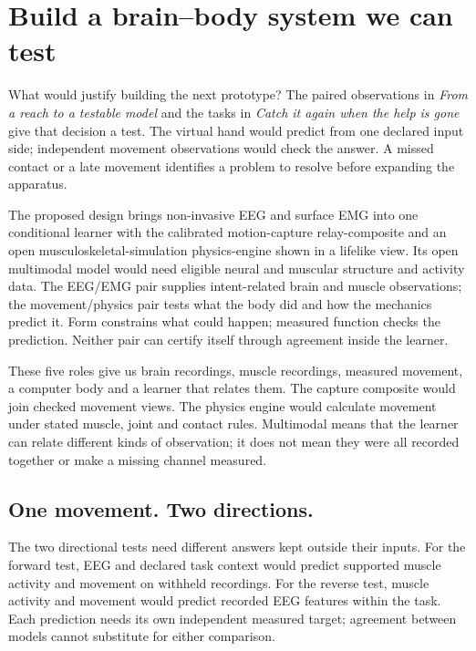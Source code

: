 \section{Build a brain--body system we can test}

What would justify building the next prototype? The paired observations in
\emph{From a reach to a testable model} and the tasks in \emph{Catch it again
when the help is gone} give that decision a test. The virtual hand would predict
from one declared input side; independent movement observations would check the
answer. A missed contact or a late movement identifies a problem to resolve
before expanding the apparatus.

The proposed design brings non-invasive EEG and surface EMG into one conditional
learner with the calibrated motion-capture relay-composite and an open
musculoskeletal-simulation physics-engine shown in a lifelike view. Its open
multimodal model would need eligible neural and muscular structure and activity
data. The EEG/EMG pair supplies intent-related brain and muscle observations;
the movement/physics pair tests what the body did and how the mechanics predict
it. Form constrains what could happen; measured function checks the prediction.
Neither pair can certify itself through agreement inside the learner.

These five roles give us brain recordings, muscle recordings, measured
movement, a computer body and a learner that relates them. The capture
composite would join checked movement views. The physics engine would
calculate movement under stated muscle, joint and contact rules. Multimodal
means that the learner can relate different kinds of observation; it does
not mean they were all recorded together or make a missing channel measured.

\subsection{One movement. Two directions.}

The two directional tests need different answers kept outside their inputs.
For the forward test, EEG and declared task context would predict supported
muscle activity and movement on withheld recordings. For the reverse test,
muscle activity and movement would predict recorded EEG features within the
task. Each prediction needs its own independent measured target; agreement
between models cannot substitute for either comparison.

